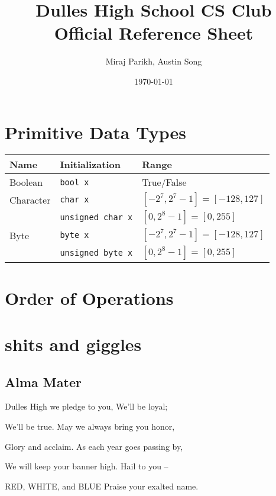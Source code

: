 \documentclass[12pt]{article}
\title{Dulles High School CS Club\\Official Reference Sheet}
\date{\today}
\author{Miraj Parikh, Austin Song}
\begin{document}

{\let\newpage\relax\maketitle} %

\section{Primitive Data Types}
\setlength{\tabcolsep}{15pt}
\renewcommand{\arraystretch}{1.25}
\begin{center}\begin{tabular}{lll}\toprule
  Name          & Initialization & Range \\\midrule
  Boolean       & \lstinline|bool x| & True/False \\
  Character     & \lstinline|char x| & \([-2^{7}, 2^7-1] = [-128, 127]\) \\
                & \lstinline|unsigned char x| & \([0, 2^8-1] = [0, 255]\) \\
  Byte          & \lstinline|byte x| & \([-2^{7}, 2^7-1] = [-128, 127]\) \\
                & \lstinline|unsigned byte x| & \([0, 2^8-1] = [0, 255]\) \\
\end{tabular}\end{center}
\section{Order of Operations}
\section{shits and giggles}
\subsection{Alma Mater}
Dulles High we pledge to you, We’ll be loyal;

We’ll be true.  May we always bring you honor,

Glory and acclaim.  As each year goes passing by,

We will keep your banner high.  Hail to you –

RED, WHITE, and BLUE Praise your exalted name.
\end{document}
